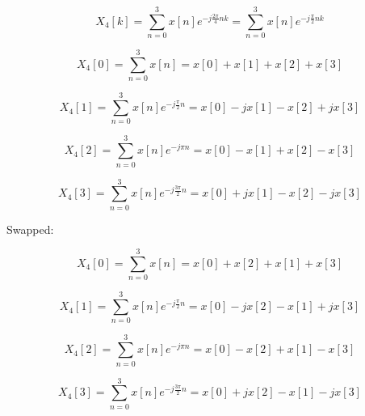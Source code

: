 \documentclass[11pt]{article}
\begin{document}
\[X_4[k] = \sum_{n=0}^{3} x[n] e^{-j\frac{2\pi}{4}nk} = \sum_{n=0}^{3} x[n] e^{-j\frac{\pi}{2}nk} \]

\[X_4[0] = \sum_{n=0}^{3} x[n] = x[0] + x[1] + x[2] + x[3]\]

\[X_4[1] = \sum_{n=0}^{3} x[n] e^{-j\frac{\pi}{2}n} = x[0] - jx[1] - x[2] + jx[3]\]

\[X_4[2] = \sum_{n=0}^{3} x[n] e^{-j\pi n} = x[0] - x[1] + x[2] - x[3]\]

\[X_4[3] = \sum_{n=0}^{3} x[n] e^{-j\frac{3\pi}{2} n} = x[0] + jx[1] - x[2] - jx[3]\]

Swapped:

\[X_4[0] = \sum_{n=0}^{3} x[n] = x[0] + x[2] + x[1] + x[3]\]

\[X_4[1] = \sum_{n=0}^{3} x[n] e^{-j\frac{\pi}{2}n} = x[0] - jx[2] - x[1] + jx[3]\]

\[X_4[2] = \sum_{n=0}^{3} x[n] e^{-j\pi n} = x[0] - x[2] + x[1] - x[3]\]

\[X_4[3] = \sum_{n=0}^{3} x[n] e^{-j\frac{3\pi}{2} n} = x[0] + jx[2] - x[1] - jx[3]\]
\end{document}
